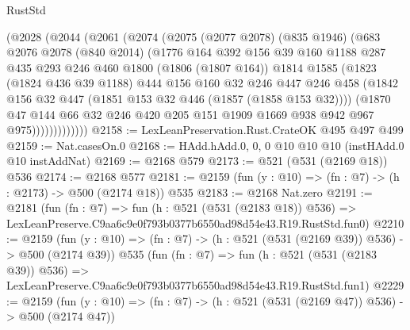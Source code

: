 \begin{lexlean}{RustStd}
\begin{coremodule}
            (@2028
              (@2044
                (@2061
                  (@2074
                    (@2075
                      (@2077 @2078)
                      (@835 @1946)
                      (@683
                        @2076
                        @2078
                        (@840 @2014)
                        (@1776
                          @164
                          @392
                          @156
                          @39
                          @160
                          @1188
                          @287
                          @435
                          @293
                          @246
                          @460
                          @1800
                          (@1806 (@1807 @164))
                          @1814
                          @1585
                          (@1823
                            (@1824 @436 @39 @1188)
                            @444
                            @156
                            @160
                            @32
                            @246
                            @447
                            @246
                            @458
                            (@1842 @156 @32 @447 (@1851 @153 @32 @446 (@1857 (@1858 @153 @32))))
                            (@1870
                              @47
                              @144
                              @66
                              @32
                              @246
                              @420
                              @205
                              @151
                              @1909
                              @1669
                              @938
                              @942
                              @967
                              @975)))))))))))))
@2158 := LexLeanPreservation.Rust.CrateOK @495 @497 @499
@2159 := Nat.casesOn.{0}
@2168 := HAdd.hAdd.{0, 0, 0} @10 @10 @10 (instHAdd.{0} @10 instAddNat)
@2169 := @2168 @579
@2173 := @521 (@531 (@2169 @18)) @536
@2174 := @2168 @577
@2181 := @2159 (fun (y : @10) => (fn : @7) -> (h : @2173) -> @500 (@2174 @18)) @535
@2183 := @2168 Nat.zero
@2191 := @2181
    (fun (fn : @7) =>
    fun (h : @521 (@531 (@2183 @18)) @536) =>
    LexLeanPreserve.C9aa6c9e0f793b0377b6550ad98d54e43.R19.RustStd.fun0)
@2210 := @2159
    (fun (y : @10) => (fn : @7) -> (h : @521 (@531 (@2169 @39)) @536) -> @500 (@2174 @39))
    @535
    (fun (fn : @7) =>
    fun (h : @521 (@531 (@2183 @39)) @536) =>
    LexLeanPreserve.C9aa6c9e0f793b0377b6550ad98d54e43.R19.RustStd.fun1)
@2229 := @2159
    (fun (y : @10) => (fn : @7) -> (h : @521 (@531 (@2169 @47)) @536) -> @500 (@2174 @47))

\end{coremodule}
\end{lexlean}
